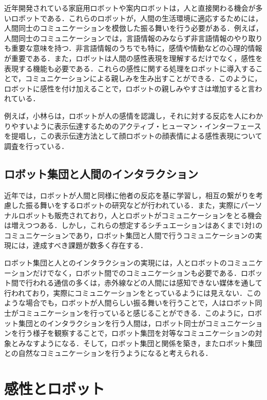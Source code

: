 近年開発されている家庭用ロボットや案内ロボットは，人と直接関わる機会が多いロボットである．これらのロボットが，人間の生活環境に適応するためには，人間同士のコミュニケーションを模倣した振る舞いを行う必要がある．例えば，人間同士のコミュニケーションでは，言語情報のみならず非言語情報のやり取りも重要な意味を持つ\cite{gengo}．非言語情報のうちでも特に，感情や情動などの心理的情報が重要である．また，ロボットは人間の感性表現を理解するだけでなく，感性を表現する機能も必要である．これらの感性に関する処理をロボットに導入することで，コミュニケーションによる親しみを生み出すことができる．このように，ロボットに感性を付け加えることで，ロボットの親しみやすさは増加すると言われている．

例えば，小林らは，ロボットが人の感情を認識し，それに対する反応を人にわかりやすいように表示伝達するためのアクティブ・ヒューマン・インターフェースを提唱し，この表示伝達方法として顔ロボットの顔表情による感性表現について調査を行っている\cite{gengo}．




\subsection{ロボット集団と人間のインタラクション}
\label{sec2.3.3}

近年では，ロボットが人間と同様に他者の反応を基に学習し，相互の繋がりを考慮した振る舞いをするロボットの研究などが行われている\cite{tekiou}．また，実際にパーソナルロボットも販売されており，人とロボットがコミュニケーションをとる機会は増えつつある\cite{rabot}．しかし，これらの想定するシチュエーションはあくまで1対1のコミュニケーションであり，ロボット集団と人間で行うコミュニケーションの実現には，達成すべき課題が数多く存在する．

ロボット集団と人とのインタラクションの実現には，人とロボットのコミュニケーションだけでなく，ロボット間でのコミュニケーションも必要である．ロボット間で行われる通信の多くは，赤外線などの人間には感知できない媒体を通して行われており，実際にコミュニケーションをとっているようには見えない．このような場合でも，ロボットが人間らしい振る舞いを行うことで，人はロボット同士がコミュニケーションを行っていると感じることができる．このように，ロボット集団とのインタラクションを行う人間は，ロボット同士がコミュニケーションを行う様子を観察することで，ロボット集団を対等なコミュニケーションの対象とみなすようになる．そして，ロボット集団と関係を築き，またロボット集団との自然なコミュニケーションを行うようになると考えられる．

\section{感性とロボット}
\label{sec2.4}



\vspace{1cm}
\begin{figure}[!h]
 \begin{center}
  \centering
  \label{fig:kansei}
 \end{center}
\end{figure}

